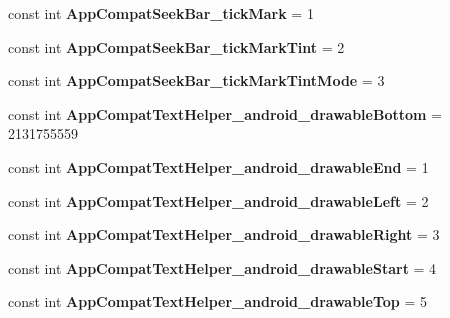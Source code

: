 \begin{DoxyCompactItemize}
const int {\bfseries App\+Compat\+Seek\+Bar\+\_\+tick\+Mark} = 1
\item 
\mbox{\label{classst_delivery_1_1_resource_1_1_styleable_a4d842b6355a5265c4c25d00e70f6b4f1}} 
const int {\bfseries App\+Compat\+Seek\+Bar\+\_\+tick\+Mark\+Tint} = 2
\item 
\mbox{\label{classst_delivery_1_1_resource_1_1_styleable_aac9d22e6cf68f58058ec0e64078d7e69}} 
const int {\bfseries App\+Compat\+Seek\+Bar\+\_\+tick\+Mark\+Tint\+Mode} = 3
\item 
\mbox{\label{classst_delivery_1_1_resource_1_1_styleable_a868ad2415177989ef6c38c108ddc3e59}} 
const int {\bfseries App\+Compat\+Text\+Helper\+\_\+android\+\_\+drawable\+Bottom} = 2131755559
\item 
\mbox{\label{classst_delivery_1_1_resource_1_1_styleable_aefc82b0950fd8465f89f23b349337796}} 
const int {\bfseries App\+Compat\+Text\+Helper\+\_\+android\+\_\+drawable\+End} = 1
\item 
\mbox{\label{classst_delivery_1_1_resource_1_1_styleable_a19f2227878f66c72a0a54cdce0eed1e6}} 
const int {\bfseries App\+Compat\+Text\+Helper\+\_\+android\+\_\+drawable\+Left} = 2
\item 
\mbox{\label{classst_delivery_1_1_resource_1_1_styleable_a4e3df8c78b8e9be330eaa8af84c25828}} 
const int {\bfseries App\+Compat\+Text\+Helper\+\_\+android\+\_\+drawable\+Right} = 3
\item 
\mbox{\label{classst_delivery_1_1_resource_1_1_styleable_ae3b13ea9038f0462acc05b8bb9ede302}} 
const int {\bfseries App\+Compat\+Text\+Helper\+\_\+android\+\_\+drawable\+Start} = 4
\item 
\mbox{\label{classst_delivery_1_1_resource_1_1_styleable_a9eea8cbd77c96aac697cfee32b5f0ead}} 
const int {\bfseries App\+Compat\+Text\+Helper\+\_\+android\+\_\+drawable\+Top} = 5
\item 

\end{DoxyCompactItemize}

